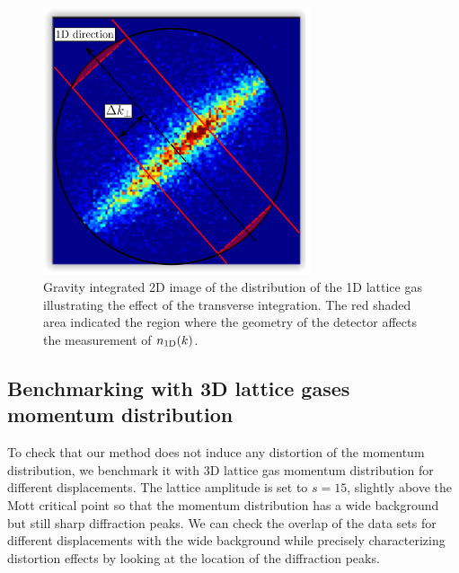 \begin{figure}
    \centering
    \includegraphics[width=0.7\textwidth]{Fig/Chapter5/1D_transverse_integration.png}
    \caption[Effect of the transverse integration of 1D gases data]{Gravity integrated 2D image of the distribution of the 1D lattice gas illustrating the effect of the transverse integration. The red shaded area indicated the region where the geometry of the detector affects the measurement of $n_{\rm{1D}} (k)$.}
    \label{fig:1D_integration}
\end{figure}

\subsection{Benchmarking with 3D lattice gases momentum distribution}

To check that our method does not induce any distortion of the momentum distribution, we benchmark it with 3D lattice gas momentum distribution for different displacements. The lattice amplitude is set to $s=15$, \ie slightly above the Mott critical point so that the momentum distribution has a wide background but still sharp diffraction peaks. We can check the overlap of the data sets for different displacements with the wide background while precisely characterizing distortion effects by looking at the location of the diffraction peaks.

